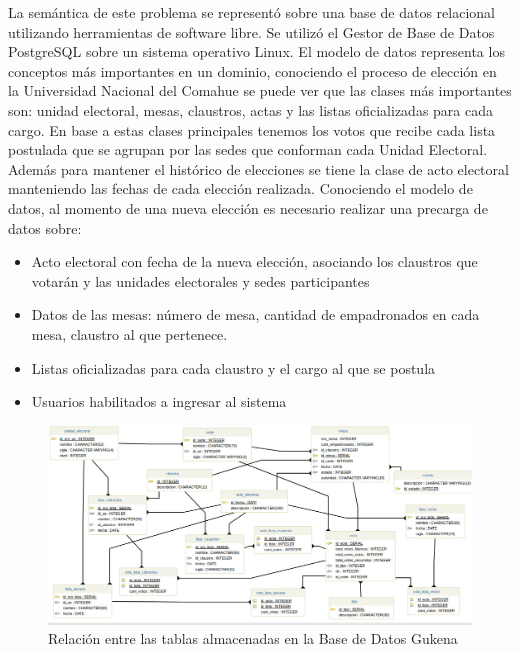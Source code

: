 La semántica de este problema se representó sobre una base de datos relacional utilizando herramientas de software libre. Se utilizó el Gestor de Base de Datos PostgreSQL sobre un sistema operativo Linux. El modelo de datos representa los conceptos más importantes en un dominio, conociendo el proceso de elección en la Universidad Nacional del Comahue se puede ver que las clases más importantes son: unidad electoral, mesas, claustros, actas y las listas oficializadas para cada cargo. En base a estas clases principales tenemos los votos que recibe cada lista postulada que se agrupan por las sedes que conforman cada Unidad Electoral. Además para mantener el histórico de elecciones se tiene la clase de acto electoral manteniendo las fechas de cada elección realizada.\newline
Conociendo el modelo de datos, al momento de una nueva elección es necesario realizar una precarga de datos sobre:
\begin{itemize}
    \item Acto electoral con fecha de la nueva elección, asociando los claustros que votarán y las unidades electorales y sedes participantes
    \item Datos de las mesas: número de mesa, cantidad de empadronados en cada mesa, claustro al que pertenece.
    \item Listas oficializadas para cada claustro y el cargo al que se postula
    \item Usuarios habilitados a ingresar al sistema
\end{itemize}
\begin{figure}[h!]
  \includegraphics[width=\textwidth]{img/gu_kena_diagramaBD.jpg}
  \caption{Relación entre las tablas almacenadas en la Base de Datos Gukena}
  \label{graf:diagramaBD}
\end{figure}

